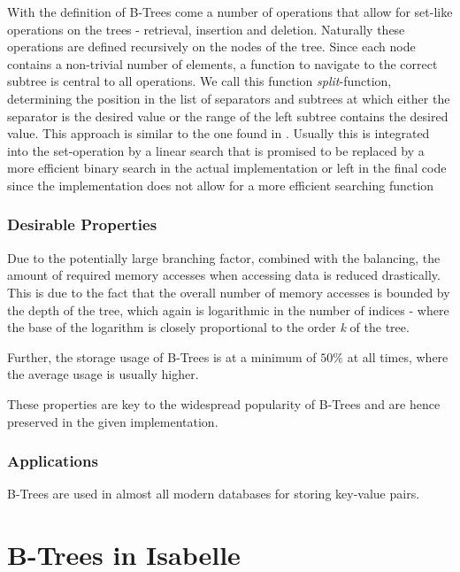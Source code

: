 With the definition of B-Trees come a number of operations that allow for set-like operations
on the trees - retrieval, insertion and deletion.
Naturally these operations are defined recursively on the nodes of the tree.
Since each node contains a non-trivial number of elements,
a function to navigate to the correct subtree is central to all operations.
We call this function \textit{split}-function,
determining the position in the list of separators and subtrees at which
either the separator is the desired value or the range of the left subtree
contains the desired value.
This approach is similar to the one found in \parencite{DBLP:conf/popl/MalechaMSW10}.
Usually this is integrated into the set-operation
by a linear search that is promised to be replaced by a more efficient binary search
in the actual implementation \parencite{DBLP:books/daglib/0023376,DBLP:journals/acta/BayerM72}
or left in the final code since the implementation does not allow for a more efficient searching function \parencite{DBLP:journals/sosym/ErnstSR15}


\subsection{Desirable Properties}

Due to the potentially large branching factor, combined with the balancing,
the amount of required memory accesses when accessing data is reduced drastically.
This is due to the fact that the overall number of memory accesses is bounded by the depth
of the tree, which again is logarithmic in the number of indices -
where the base of the logarithm is closely proportional to the order \textit{k} of the tree.

Further, the storage usage of B-Trees is at a minimum of $50\%$ at all times,
where the average usage is usually higher. \parencite{DBLP:journals/acta/BayerM72}

These properties are key to the widespread popularity of B-Trees and are
hence preserved in the given implementation.


\subsection{Applications}

B-Trees are used in almost all modern databases for storing key-value pairs.


\chapter{B-Trees in Isabelle}

